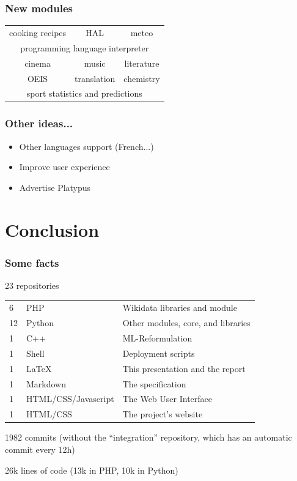 \begin{frame}
    \frametitle{New modules}
    \begin{table}
    \Large
    \centering
    \begin{tabular}{ccc}
        \textcolor{mLightBrown}{cooking recipes} & \textcolor{mDarkBrown}{HAL} & \textcolor{mMediumBrown}{meteo} \\
        \multicolumn{3}{c}{\textcolor{mDarkTeal}{programming language interpreter}} \\
        \textcolor{mMediumBrown}{cinema} & \textcolor{mDarkTeal}{music} & \textcolor{mLightBrown}{literature}\\
        \textcolor{mDarkBrown}{OEIS} & \textcolor{mLightBrown}{translation} & \textcolor{mDarkTeal}{chemistry}\\
        \multicolumn{3}{c}{\textcolor{mMediumBrown}{sport statistics and predictions}} \\
    \end{tabular}
    \end{table}
\end{frame}

\begin{frame}
    \frametitle{Other ideas...}

    \begin{itemize}
        \item Other languages support (French...)
        \item Improve user experience
        \item Advertise \alert{Platypus}
    \end{itemize}
\end{frame}

\section{Conclusion}

\begin{frame}
    \frametitle{Some facts} %
    \alert{23 repositories}

    \begin{tabular}{lll}
        6 & PHP & Wikidata libraries and module\\
        12 & Python & Other modules, core, and libraries\\
        1 & C++ & ML-Reformulation\\
        1 & Shell & Deployment scripts\\
        1 & \LaTeX & This presentation and the report\\
        1 & Markdown & The specification\\
        1 & HTML/CSS/Javascript & The Web User Interface\\
        1 & HTML/CSS & The project's website\\
    \end{tabular}

    \alert{1982 commits} (without the ``integration'' repository, which has an automatic commit every 12h)

    \alert{26k lines} of code (13k in PHP, 10k in Python)
\end{frame}

